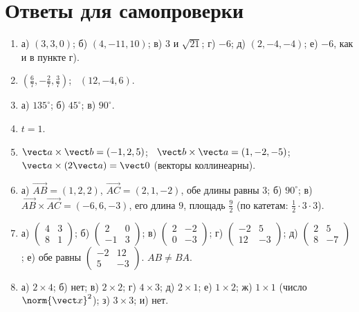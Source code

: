 \section*{Ответы для самопроверки}
\begin{small}
\begin{enumerate}[label=\textbf{\arabic*.}, leftmargin=2em]
  \item а) $(3,3,0)$; б) $(4,-11,10)$; в) $3$ и $\sqrt{21}$; г) $-6$; д) $(2,-4,-4)$; е) $-6$, как и в пункте г).
  \item $\left(\frac67,-\frac27,\frac37\right)$; \ $(12,-4,6)$.
  \item а) $135^\circ$; б) $45^\circ$; в) $90^\circ$.
  \item $t=1$.
  \item $\vect a\times\vect b=(-1,2,5)$; \ $\vect b\times\vect a=(1,-2,-5)$; \ $\vect a\times(2\vect a)=\vect 0$ (векторы коллинеарны).
  \item а) $\overrightarrow{AB}=(1,2,2)$, $\overrightarrow{AC}=(2,1,-2)$, обе длины равны $3$; б) $90^\circ$; в) $\overrightarrow{AB}\times\overrightarrow{AC}=(-6,6,-3)$, его длина $9$, площадь $\frac92$ (по катетам: $\frac12\cdot3\cdot3$).
  \item а) $\begin{pmatrix}4&3\\8&1\end{pmatrix}$; б) $\begin{pmatrix}2&0\\-1&3\end{pmatrix}$; в) $\begin{pmatrix}2&-2\\0&-3\end{pmatrix}$; г) $\begin{pmatrix}-2&5\\12&-3\end{pmatrix}$; д) $\begin{pmatrix}2&5\\8&-7\end{pmatrix}$; е) обе равны $\begin{pmatrix}-2&12\\5&-3\end{pmatrix}$. $AB\ne BA$.
  \item а) $2\times4$; б) нет; в) $2\times2$; г) $4\times3$; д) $2\times1$; е) $1\times2$; ж) $1\times1$ (число $\norm{\vect x}^2$); з) $3\times3$; и) нет.
\end{enumerate}
\end{small}
